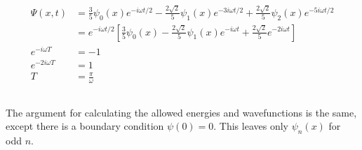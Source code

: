 \documentclass{article}
\begin{document}
\begin{enumerate}
\begin{align*}
          \Psi(x, t)        & = \frac{3}{5} \psi_0(x) e^{-i \omega t / 2} - \frac{2 \sqrt{2}}{5} \psi_1(x) e^{-3 i \omega t / 2} + \frac{2 \sqrt{2}}{5} \psi_2(x) e^{-5 i \omega t / 2}                               \\
                            & = e^{-i \omega t / 2} \left[ \frac{3}{5} \psi_0(x) - \frac{2 \sqrt{2}}{5} \psi_1(x) e^{-i \omega t} + \frac{2 \sqrt{2}}{5} e^{-2 i \omega t} \right]                                    \\
          e^{-i \omega T}   & = -1                                                                                                                                                                                    \\
          e^{-2 i \omega T} & = 1                                                                                                                                                                                     \\
          T                 & = \frac{\pi}{\omega}
        \end{align*}
\end{enumerate}

\subsection{}

The argument for calculating the allowed energies and wavefunctions is the same, except there is a boundary condition $\psi(0) = 0$. This leaves only $\psi_n(x)$ for odd $n$.

\setcounter{subsection}{42}
\subsection{}
\end{document}
